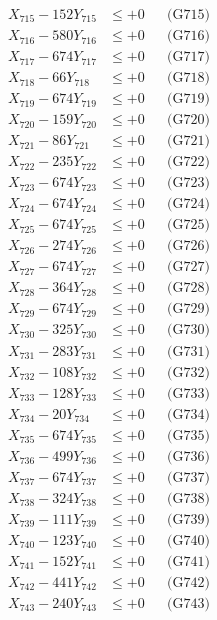 \documentclass[a4paper,10pt]{article}
\begin{document}
{\begin{align}
X_{715} - 152Y_{715} &\leq +0 && \text{(G715)} \\
X_{716} - 580Y_{716} &\leq +0 && \text{(G716)} \\
X_{717} - 674Y_{717} &\leq +0 && \text{(G717)} \\
X_{718} - 66Y_{718} &\leq +0 && \text{(G718)} \\
X_{719} - 674Y_{719} &\leq +0 && \text{(G719)} \\
X_{720} - 159Y_{720} &\leq +0 && \text{(G720)} \\
\allowbreak
X_{721} - 86Y_{721} &\leq +0 && \text{(G721)} \\
X_{722} - 235Y_{722} &\leq +0 && \text{(G722)} \\
X_{723} - 674Y_{723} &\leq +0 && \text{(G723)} \\
X_{724} - 674Y_{724} &\leq +0 && \text{(G724)} \\
X_{725} - 674Y_{725} &\leq +0 && \text{(G725)} \\
X_{726} - 274Y_{726} &\leq +0 && \text{(G726)} \\
X_{727} - 674Y_{727} &\leq +0 && \text{(G727)} \\
X_{728} - 364Y_{728} &\leq +0 && \text{(G728)} \\
X_{729} - 674Y_{729} &\leq +0 && \text{(G729)} \\
X_{730} - 325Y_{730} &\leq +0 && \text{(G730)} \\
\allowbreak
X_{731} - 283Y_{731} &\leq +0 && \text{(G731)} \\
X_{732} - 108Y_{732} &\leq +0 && \text{(G732)} \\
X_{733} - 128Y_{733} &\leq +0 && \text{(G733)} \\
X_{734} - 20Y_{734} &\leq +0 && \text{(G734)} \\
X_{735} - 674Y_{735} &\leq +0 && \text{(G735)} \\
X_{736} - 499Y_{736} &\leq +0 && \text{(G736)} \\
X_{737} - 674Y_{737} &\leq +0 && \text{(G737)} \\
X_{738} - 324Y_{738} &\leq +0 && \text{(G738)} \\
X_{739} - 111Y_{739} &\leq +0 && \text{(G739)} \\
X_{740} - 123Y_{740} &\leq +0 && \text{(G740)} \\
\allowbreak
X_{741} - 152Y_{741} &\leq +0 && \text{(G741)} \\
X_{742} - 441Y_{742} &\leq +0 && \text{(G742)} \\
X_{743} - 240Y_{743} &\leq +0 && \text{(G743)} \\

\end{align}}
\end{document}
